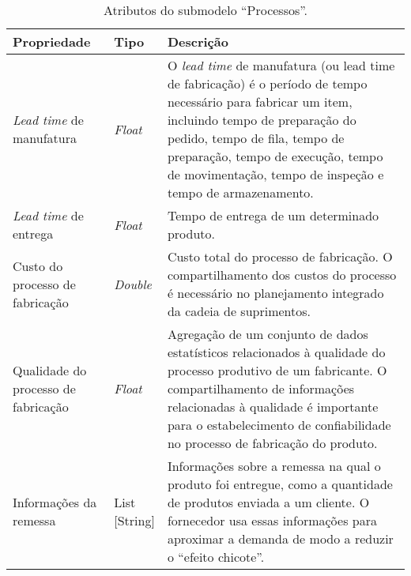 \begin{table}[htb]
	\centering
	\caption{Atributos do submodelo ``Processos''.}
	\begin{tabular}{p{3.5cm}p{1.5cm}p{9cm}}
		\hline
		\textbf{Propriedade}
		 & \textbf{Tipo}
		 & \textbf{Descrição}                                                                                                                                                                                                                                                                        \\

		\hline
		\textit{Lead time} de manufatura
		 & \textit{Float}
		 & O \textit{lead time} de manufatura (ou lead time de fabricação) é o período de tempo necessário para fabricar um item, incluindo tempo de preparação do pedido, tempo de fila, tempo de preparação, tempo de execução, tempo de movimentação, tempo de inspeção e tempo de armazenamento. \\


		\hline
		\textit{Lead time} de entrega
		 & \textit{Float}
		 & Tempo de entrega de um determinado produto.                                                                                                                                                                                                                                               \\

		\hline
		Custo do processo de fabricação
		 & \textit{Double}
		 & Custo total do processo de fabricação. O compartilhamento dos custos do processo é necessário no planejamento integrado da cadeia de suprimentos.                                                                                                                                         \\

		\hline
		Qualidade do processo de fabricação
		 & \textit{Float}
		 & Agregação de um conjunto de dados estatísticos relacionados à qualidade do processo produtivo de um fabricante. O compartilhamento de informações relacionadas à qualidade é importante para o estabelecimento de confiabilidade no processo de fabricação do produto.                    \\

		\hline
		Informações da remessa
		 & \makecell{List\\{[String]}}
		 & Informações sobre a remessa na qual o produto foi entregue, como a quantidade de produtos enviada a um cliente. O fornecedor usa essas informações para aproximar a demanda de modo a reduzir o ``efeito chicote''.                                                                       \\


\end{tabular}
\end{table}

